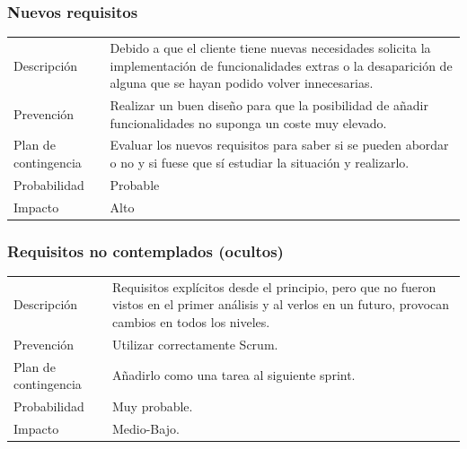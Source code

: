 \subsubsection{Nuevos requisitos}
\begin{table}[H]
    \begin{center}
        \begin{tabular}{l p{8cm}}
            Descripci\'{o}n                 & Debido a que el cliente tiene nuevas necesidades solicita la
            								  implementaci\'{o}n de funcionalidades extras o la desaparici\'{o}n de alguna que se 
            								  hayan podido volver innecesarias. \\
            Prevenci\'{o}n                  & Realizar un buen dise\~{n}o para que la posibilidad de añadir
            								  funcionalidades no suponga un coste muy elevado. \\ 
            Plan de contingencia            & Evaluar los nuevos requisitos para saber si se pueden
            								  abordar o no y si fuese que s\'i estudiar la situación y realizarlo. \\
            Probabilidad                    & Probable \\
            Impacto                         & Alto \\
        \end{tabular}
    \end{center}
    
\end{table}

\subsubsection{Requisitos no contemplados (ocultos)}
\begin{table}[H]
    \begin{center}
        \begin{tabular}{l p{8cm}}
            Descripci\'{o}n                 & Requisitos explícitos desde el principio, pero que no fueron
            vistos en el primer an\'{a}lisis y al verlos en un futuro, provocan cambios en todos los niveles. \\
            Prevenci\'{o}n                  & Utilizar correctamente Scrum. \\ 
            Plan de contingencia            & A\~{n}adirlo como una tarea al siguiente sprint. \\
            Probabilidad                    & Muy probable. \\
            Impacto                         & Medio-Bajo. \\
        \end{tabular}
    \end{center}
    
\end{table}

